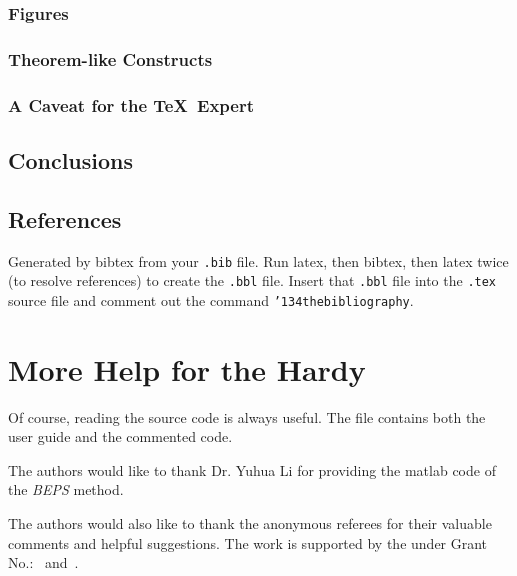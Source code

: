 \subsubsection{Figures}

\subsubsection{Theorem-like Constructs}
\subsubsection*{A Caveat for the \TeX\ Expert}

\subsection{Conclusions}

\subsection{References}
Generated by bibtex from your \texttt{.bib} file. Run latex,
then bibtex, then latex twice (to resolve references)
to create the \texttt{.bbl} file. Insert that \texttt{.bbl}
file into the \texttt{.tex} source file and comment out
the command \texttt{{\char'134}thebibliography}.


\section{More Help for the Hardy}

Of course, reading the source code is always useful. The file
 contains both the user guide and the commented
code.

\begin{acks}
    The authors would like to thank Dr. Yuhua Li for providing the
    matlab code of the \textit{BEPS} method.

    The authors would also like to thank the anonymous referees for
    their valuable comments and helpful suggestions. The work is
    supported by the  under Grant
    No.:~
    and~.

\end{acks}
